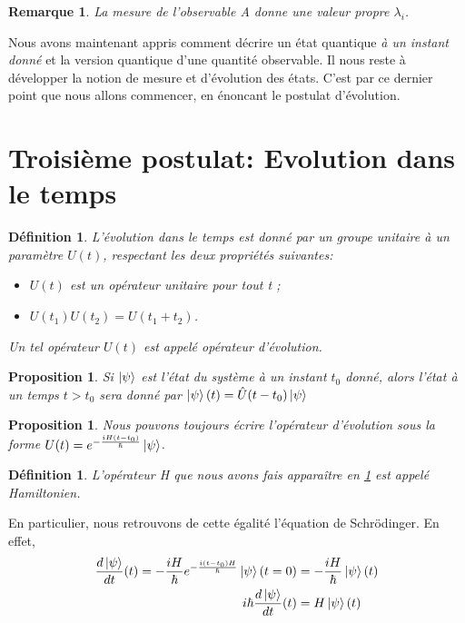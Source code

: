 \documentclass[11pt,twoside,a4paper]{report}
\numberwithin{equation}{part}
\newtheorem{definition}[theorem]{Définition}
\newtheorem{property}[theorem]{Proposition}
\newtheorem{remark}[theorem]{Remarque}
\begin{document}
\begin{remark}
    La mesure de l'observable A donne une valeur propre $\lambda_i$.
\end{remark}

Nous avons maintenant appris comment décrire un état quantique \textit{à un instant donné} et la version quantique d'une quantité observable. Il nous reste à développer la notion de mesure et d'évolution des états. C'est par ce dernier point que nous allons commencer, en énoncant le postulat d'évolution.

\section{Troisième postulat: Evolution dans le temps}

\begin{definition}
    L'évolution dans le temps est donné par un groupe unitaire à un paramètre $U(t)$, respectant les deux propriétés suivantes:
    \begin{itemize}
        \item $U(t)$ est un opérateur unitaire pour tout t ;
        \item $U(t_1)U(t_2)=U(t_1+t_2)$.
    \end{itemize}
    Un tel opérateur $U(t)$ est appelé \emph{opérateur d'évolution}.
\end{definition}

\begin{property}
    Si $\ket{\psi}$ est l'état du système à un instant $t_0$ donné, alors l'état à un temps $t>t_0$ sera donné par 
    \begin{math}
        \ket{\psi}(t) = \hat{U}(t-t_0)\ket{\psi}
    \end{math}
\end{property}

\begin{property}
    \label{Operateur d'evolution}
    Nous pouvons toujours écrire l'opérateur d'évolution sous la forme $U(t) = e^{-\frac{iH(t-t_0)}{\hbar}}\ket{\psi}$. 
\end{property}

\begin{definition}
    L'opérateur H que nous avons fais apparaître en \ref{Operateur d'evolution} est appelé Hamiltonien. 
\end{definition}

En particulier, nous retrouvons de cette égalité l'équation de Schrödinger. En effet,
\begin{align}
    \frac{d\ket{\psi}}{dt} (t)= -\frac{iH}{\hbar}e^{-\frac{i(t-t_0)H}{\hbar}}\ket{\psi}(t=0) &= -\frac{iH}{\hbar}\ket{\psi}(t)\\
    i\hbar\frac{d\ket{\psi}}{dt} (t) &= H\ket{\psi}(t) \label{Schrodinger}
\end{align}
\end{document}
